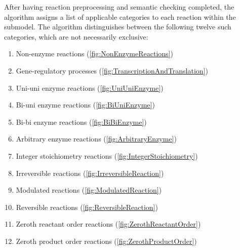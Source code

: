 After having reaction preprocessing and semantic checking completed, the algorithm assigns a list of applicable categories to each reaction within the submodel.
The algorithm distinguishes between the following twelve such categories, which are not necessarily exclusive:\\
\noindent
\begin{minipage}[t]{.5\textwidth}
\raggedleft
\begin{enumerate}
  \item Non-enzyme reactions (\cref{fig:NonEnzymeReactions})
  \item Gene-regulatory processes (\cref{fig:TranscriptionAndTranslation})
  \item Uni-uni enzyme reactions (\cref{fig:UniUniEnzyme})
  \item Bi-uni enzyme reactions (\cref{fig:BiUniEnzyme})
  \item Bi-bi enzyme reactions (\cref{fig:BiBiEnzyme})
  \item Arbitrary enzyme reactions (\cref{fig:ArbitraryEnzyme})
\end{enumerate}
\end{minipage}%
\begin{minipage}[t]{.5\textwidth}
\raggedleft
\begin{enumerate}
  \setcounter{enumi}{6}
  \item Integer stoichiometry reactions (\cref{fig:IntegerStoichiometry})
  \item Irreversible reactions (\cref{fig:IrreversibleReaction})
  \item Modulated reactions (\cref{fig:ModulatedReaction})
  \item Reversible reactions (\cref{fig:ReversibleReaction})
  \item Zeroth reactant order reactions (\cref{fig:ZerothReactantOrder})
  \item Zeroth product order reactions (\cref{fig:ZerothProductOrder})
\end{enumerate}
\end{minipage}\\[1em]
